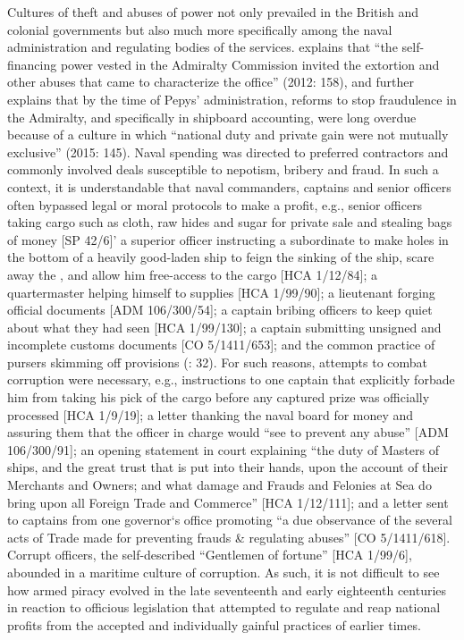 Cultures of theft and abuses of power not only prevailed in the British and colonial governments but also much more specifically among the naval administration and regulating bodies of the  services. \citeauthor{Bicheno2012} explains that “the self-financing power vested in the Admiralty Commission invited the extortion and other abuses that came to characterize the office” (2012: 158), and \citeauthor{Lincoln2015} further explains that by the time of Pepys’ administration, reforms to stop fraudulence in the Admiralty, and specifically in shipboard accounting, were long overdue because of a culture in which “national duty and private gain were not mutually exclusive” (2015: 145). Naval spending was directed to preferred contractors and commonly involved deals susceptible to nepotism, bribery and fraud. In such a context, it is understandable that naval commanders, captains and senior officers often bypassed legal or moral protocols to make a profit, e.g., senior officers taking cargo such as cloth, raw hides and sugar for private sale and stealing bags of money [SP 42/6]' a superior officer instructing a subordinate to make holes in the bottom of a heavily good-laden ship to feign the sinking of the ship, scare away the , and allow him free-access to the cargo [HCA 1/12/84]; a quartermaster helping himself to  supplies [HCA 1/99/90]; a lieutenant forging official documents [ADM 106/300/54]; a captain bribing officers to keep quiet about what they had seen [HCA 1/99/130]; a captain submitting unsigned and incomplete customs documents [CO 5/1411/653]; and the common practice of pursers skimming off provisions (\citealt{AdkinsAdkins2008}: 32).  For such reasons, attempts to combat corruption were necessary, e.g., instructions to one captain that explicitly forbade him from taking his pick of the cargo before any captured prize was officially processed [HCA 1/9/19]; a letter thanking the naval board for money and assuring them that the officer in charge would “see to prevent any abuse” [ADM 106/300/91]; an opening statement in court explaining “the duty of Masters of ships, and the great trust that is put into their hands, upon the account of their Merchants and Owners; and what damage and Frauds and Felonies at Sea do bring upon all Foreign Trade and Commerce” [HCA 1/12/111]; and a letter sent to captains from one governor‘s office promoting “a due observance of the several acts of Trade made for preventing frauds \& regulating abuses” [CO 5/1411/618]. Corrupt officers, the self-described “Gentlemen of fortune” [HCA 1/99/6], abounded in a maritime culture of corruption. As such, it is not difficult to see how armed piracy evolved in the late seventeenth and early eighteenth centuries in reaction to officious legislation that attempted to regulate and reap national profits from the accepted and individually gainful practices of earlier times. 

